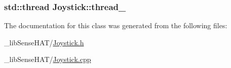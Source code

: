 \subsubsection[{\texorpdfstring{thread\+\_\+}{thread_}}]{\setlength{\rightskip}{0pt plus 5cm}std\+::thread Joystick\+::thread\+\_\+\hspace{0.3cm}{\ttfamily [protected]}}\hypertarget{class_joystick_a885c832d840018ec59c82f081fa18060}{}\label{class_joystick_a885c832d840018ec59c82f081fa18060}


The documentation for this class was generated from the following files\+:\begin{DoxyCompactItemize}
\item 
\+\_\+lib\+Sense\+H\+A\+T/\hyperlink{_joystick_8h}{Joystick.\+h}\item 
\+\_\+lib\+Sense\+H\+A\+T/\hyperlink{_joystick_8cpp}{Joystick.\+cpp}\end{DoxyCompactItemize}
